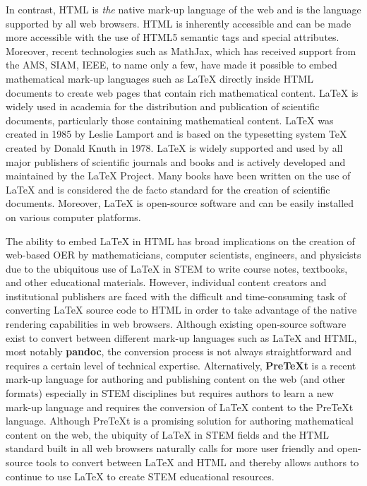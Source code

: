\documentclass[11pt]{article}
\begin{document}
In contrast, HTML is \textit{the} native mark-up language of the web and is the language supported by all web browsers.  HTML is inherently accessible and can be made more accessible with the use of HTML5 semantic tags and special attributes.  Moreover, recent technologies such as MathJax, which has received support from the AMS, SIAM, IEEE, to name only a few, have made it possible to embed mathematical mark-up languages such as LaTeX directly inside HTML documents to create web pages that contain rich mathematical content.  LaTeX is widely used in academia for the distribution and publication of scientific documents, particularly those containing mathematical content.  LaTeX was created in 1985 by Leslie Lamport and is based on the typesetting system TeX created by Donald Knuth in 1978.  LaTeX is widely supported and used by all major publishers of scientific journals and books and is actively developed and maintained by the LaTeX Project.  Many books have been written on the use of LaTeX and is considered the de facto standard for the creation of scientific documents.  Moreover, LaTeX is open-source software and can be easily installed on various computer platforms.

The ability to embed LaTeX in HTML has broad implications on the creation of web-based OER  by mathematicians, computer scientists, engineers, and physicists due to the ubiquitous use of LaTeX in STEM to write course notes, textbooks, and other educational materials.  However, individual content creators and institutional publishers are faced with the difficult and time-consuming task of converting LaTeX source code to HTML in order to take advantage of the native rendering capabilities in web browsers.  Although existing open-source software exist to convert between different mark-up languages such as LaTeX and HTML, most notably \textbf{pandoc}, the conversion process is not always straightforward and requires a certain level of technical expertise.  Alternatively, \textbf{PreTeXt} is a recent mark-up language for authoring and publishing content on the web (and other formats) especially in STEM disciplines but requires authors to learn a new mark-up language and requires the conversion of LaTeX content  to the PreTeXt language.  Although PreTeXt is a promising solution for authoring mathematical content on the web, the ubiquity of LaTeX in STEM fields and the HTML standard built in all web browsers naturally calls for more user friendly and open-source tools to convert between LaTeX and HTML and thereby allows authors to continue to use LaTeX to create STEM educational resources.
\end{document}
